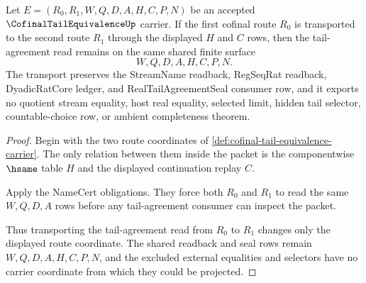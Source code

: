 \begin{theorem}
\label{thm:cofinal-tail-equivalence-tail-agreement-transport}
Let $E=(R_0,R_1,W,Q,D,A,H,C,P,N)$ be an accepted $\CofinalTailEquivalenceUp$ carrier. If the first cofinal route $R_0$ is transported to the second route $R_1$ through the displayed $H$ and $C$ rows, then the tail-agreement read remains on the same shared finite surface
$$
W,Q,D,A,H,C,P,N.
$$
The transport preserves the StreamName readback, RegSeqRat readback, DyadicRatCore ledger, and RealTailAgreementSeal consumer row, and it exports no quotient stream equality, host real equality, selected limit, hidden tail selector, countable-choice row, or ambient completeness theorem.
\end{theorem}
\begin{proof}
Begin with the two route coordinates of \autoref{def:cofinal-tail-equivalence-carrier}. The only relation between them inside the packet is the componentwise $\hsame$ table $H$ and the displayed continuation replay $C$.

Apply the NameCert obligations. They force both $R_0$ and $R_1$ to read the same $W,Q,D,A$ rows before any tail-agreement consumer can inspect the packet.

Thus transporting the tail-agreement read from $R_0$ to $R_1$ changes only the displayed route coordinate. The shared readback and seal rows remain $W,Q,D,A,H,C,P,N$, and the excluded external equalities and selectors have no carrier coordinate from which they could be projected.
\end{proof}

